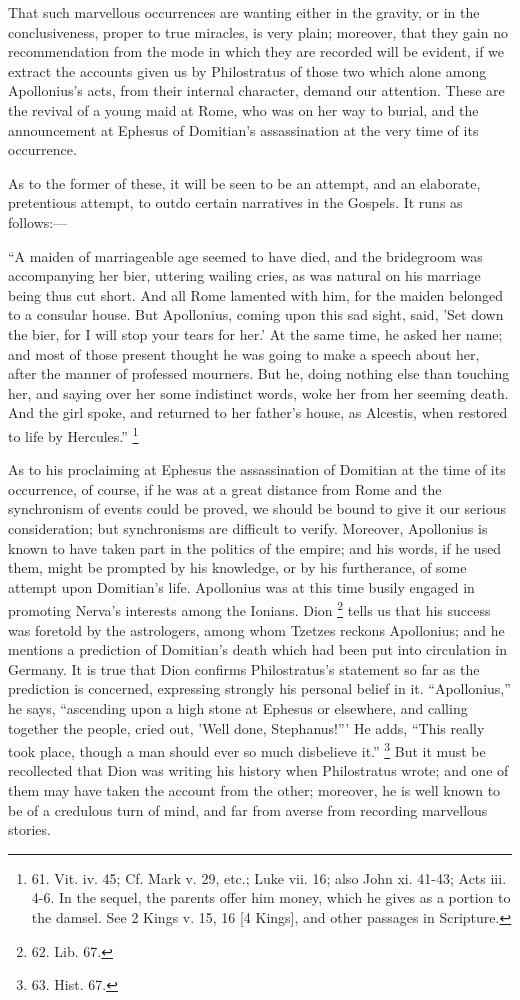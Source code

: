 That such marvellous
occurrences are wanting either in the gravity, or in the
conclusiveness, proper to true miracles, is very plain; moreover, that
they gain no recommendation from the mode in which they are recorded
will be evident, if we extract the accounts given us by Philostratus
of those two which alone among Apollonius's acts, from their
internal character, demand our attention. These are the revival of a
young maid at Rome, who was on her way to burial, and the announcement
at Ephesus of Domitian's assassination at the very time of its
occurrence.

As to the former of these, it
will be seen to be an attempt, and an elaborate, pretentious attempt,
to outdo certain narratives in the Gospels. It runs as follows:—

``A maiden of marriageable age seemed to have died, and the bridegroom was
accompanying her bier, uttering wailing cries, as was natural on his
marriage being thus cut short. And all Rome lamented with him, for the
maiden belonged to a consular house. But Apollonius, coming upon this
sad sight, said, 'Set down the bier, for I will stop your tears for
her.' At the same time, he asked her name; and most of those present
thought he was going to make a speech about her, after the manner of
professed mourners. But he, doing nothing else than touching her, and
saying over her some indistinct words, woke her from her seeming
death. And the girl spoke, and returned to her father's house, as
Alcestis, when restored to life by Hercules.'' \footnote{61.
Vit. iv. 45; Cf. Mark v. 29, etc.; Luke vii. 16; also John xi. 41-43;
Acts iii. 4-6. In the sequel, the parents offer him money, which he
gives as a portion to the damsel. See 2 Kings v. 15, 16 [4 Kings], and
other passages in Scripture.}

As to his proclaiming at
Ephesus the assassination of Domitian at the time of its occurrence,
of course, if he was at a great distance from Rome and the synchronism
of events could be proved, we should be bound to give it our serious
consideration; but synchronisms are difficult to verify. Moreover,
Apollonius is known to have taken part in the politics of the empire;
and his words, if he used them, might be prompted by his knowledge, or
by his furtherance, of some attempt upon Domitian's life. Apollonius
was at this time busily engaged in promoting Nerva's interests
among the Ionians. Dion \footnote{62.
Lib. 67.}
tells us that his success was foretold by the astrologers, among whom
Tzetzes reckons Apollonius; and he mentions a prediction of Domitian's
death which had been put into circulation in Germany. It is true that
Dion confirms Philostratus's statement so far as the prediction is
concerned, expressing strongly his personal belief in it. ``Apollonius,''
he says, ``ascending upon a high stone at Ephesus or elsewhere, and
calling together the people, cried out, 'Well done, Stephanus!''' He
adds, ``This really took place, though a man should ever so much
disbelieve it.'' \footnote{63.
Hist. 67.} But it
must be recollected that Dion was writing his history when
Philostratus wrote; and one of them may have taken the account from
the other; moreover, he is well known to be of a credulous turn of
mind, and far from averse from recording marvellous stories.

